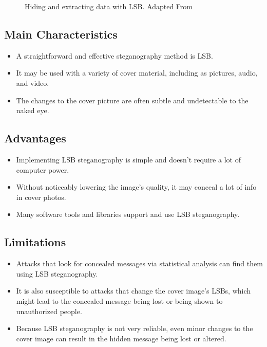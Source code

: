 \begin{figure}[ht!]
\centering
{}
\caption{Hiding and extracting data with LSB. Adapted From \cite{Hidings}}
\end{figure}

\subsection{Main Characteristics}
\begin{itemize}
\item A straightforward and effective steganography method is LSB.
\item It may be used with a variety of cover material, including as pictures, audio, and video.
\item The changes to the cover picture are often subtle and undetectable to the naked eye.
\end{itemize}

\subsection{Advantages}
\begin{itemize}
\item Implementing LSB steganography is simple and doesn't require a lot of computer power.
\item Without noticeably lowering the image's quality, it may conceal a lot of info in cover photos.
\item Many software tools and libraries support and use LSB steganography.
\end{itemize}

\subsection{Limitations}
\begin{itemize}
\item Attacks that look for concealed messages via statistical analysis can find them using LSB steganography.
\item It is also susceptible to attacks that change the cover image's LSBs, which might lead to the concealed message being lost or being shown to unauthorized people.
\item Because LSB steganography is not very reliable, even minor changes to the cover image can result in the hidden message being lost or altered.
\end{itemize}

